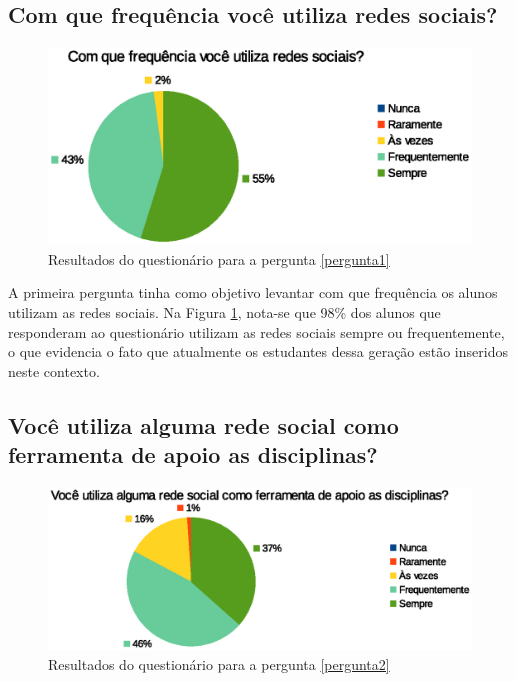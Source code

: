 \subsection*{Com que frequência você utiliza redes sociais?}

\begin{figure}[h]
    \centering
    \includegraphics[keepaspectratio=true,scale=1]
      {figuras/pergunta1p.eps}
    \caption{Resultados do questionário para a pergunta \ref{pergunta1}}
    \label{fig:pergunta1}
\end{figure}

A primeira pergunta tinha como objetivo levantar com que frequência os alunos utilizam as redes sociais. Na Figura \ref{fig:pergunta1}, nota-se que 98\% dos alunos que responderam ao questionário utilizam as redes sociais sempre ou frequentemente, o que evidencia o fato que atualmente os estudantes dessa geração estão inseridos neste contexto.

\subsection*{Você utiliza alguma rede social como ferramenta de apoio as disciplinas?}

\begin{figure}[h]
    \centering
    \includegraphics[keepaspectratio=true,scale=1]
      {figuras/pergunta2p.eps}
    \caption{Resultados do questionário para a pergunta \ref{pergunta2}}
    \label{fig:pergunta2}
\end{figure}

